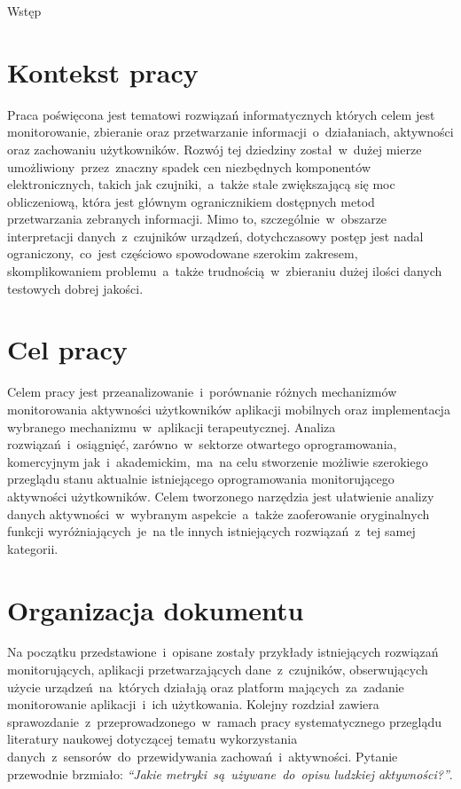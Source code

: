 \begin{chapter}{Wstęp}
	\newcommand{\chapterPath}{chapters/Introduction}

	\section{Kontekst pracy}
	Praca poświęcona jest tematowi rozwiązań informatycznych których celem jest monitorowanie, zbieranie oraz przetwarzanie informacji~o~działaniach, aktywności oraz zachowaniu użytkowników. Rozwój tej dziedziny został~w~dużej mierze umożliwiony~przez~znaczny spadek cen niezbędnych komponentów elektronicznych, takich jak czujniki,~a~także stale zwiększającą się moc obliczeniową, która jest głównym ogranicznikiem dostępnych metod przetwarzania zebranych informacji. Mimo to, szczególnie~w~obszarze interpretacji danych~z~czujników urządzeń, dotychczasowy postęp jest nadal ograniczony,~co~jest częściowo spowodowane szerokim zakresem, skomplikowaniem problemu~a~także trudnością~w~zbieraniu dużej ilości danych testowych dobrej jakości. 
	
	\section{Cel pracy}
	Celem pracy jest przeanalizowanie~i~porównanie różnych mechanizmów monitorowania aktywności użytkowników aplikacji mobilnych oraz implementacja wybranego mechanizmu~w~aplikacji terapeutycznej. Analiza rozwiązań~i~osiągnięć, zarówno~w~sektorze otwartego oprogramowania, komercyjnym jak~i~akademickim,~ma~na celu stworzenie możliwie szerokiego przeglądu stanu aktualnie istniejącego oprogramowania monitorującego aktywności użytkowników. Celem tworzonego narzędzia jest ułatwienie analizy danych aktywności~w~wybranym aspekcie~a~także zaoferowanie oryginalnych funkcji wyróżniających~je~na tle innych istniejących rozwiązań~z~tej samej kategorii.
	
	\section{Organizacja dokumentu}
	Na początku przedstawione~i~opisane zostały przykłady istniejących rozwiązań monitorujących, aplikacji przetwarzających dane~z~czujników, obserwujących użycie urządzeń~na~których działają oraz platform mających~za~zadanie monitorowanie aplikacji~i~ich użytkowania. Kolejny rozdział zawiera sprawozdanie~z~przeprowadzonego~w~ramach pracy systematycznego przeglądu literatury naukowej dotyczącej tematu wykorzystania danych~z~sensorów~do~przewidywania zachowań~i~aktywności. Pytanie przewodnie brzmiało: {\it ``Jakie metryki~są~używane~do~opisu ludzkiej aktywności?''}. 
	

\end{chapter}
